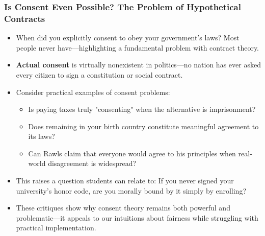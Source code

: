 \documentclass[aspectratio=169]{beamer}
\begin{document}
\begin{frame}
  \frametitle{Is Consent Even Possible? The Problem of Hypothetical Contracts}
  
  \begin{itemize}
    \item When did you explicitly consent to obey your government's laws? Most people never have—highlighting a fundamental problem with contract theory.
    \item \textbf{Actual consent} is virtually nonexistent in politics—no nation has ever asked every citizen to sign a constitution or social contract.
    \item Consider practical examples of consent problems:
      \begin{itemize}
        \item Is paying taxes truly "consenting" when the alternative is imprisonment?
        \item Does remaining in your birth country constitute meaningful agreement to its laws?
        \item Can Rawls claim that everyone would agree to his principles when real-world disagreement is widespread?
      \end{itemize}
    \item This raises a question students can relate to: If you never signed your university's honor code, are you morally bound by it simply by enrolling?
    \item These critiques show why consent theory remains both powerful and problematic—it appeals to our intuitions about fairness while struggling with practical implementation.
  \end{itemize}
\end{frame}
\end{document}
